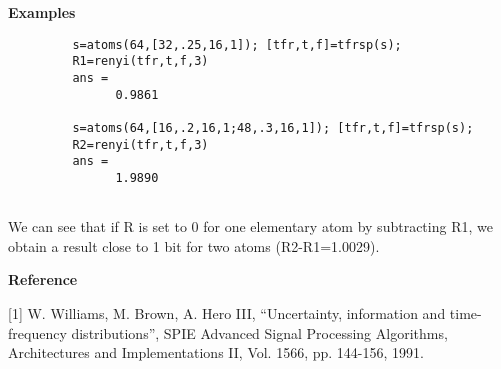 \newpage

{\bf \large \sf Examples}\\
\hspace*{1.5cm}
\begin{minipage}[t]{13.5cm}

\begin{verbatim}
         s=atoms(64,[32,.25,16,1]); [tfr,t,f]=tfrsp(s); 
         R1=renyi(tfr,t,f,3) 
         ans =
               0.9861

         s=atoms(64,[16,.2,16,1;48,.3,16,1]); [tfr,t,f]=tfrsp(s); 
         R2=renyi(tfr,t,f,3) 
         ans =
               1.9890
         
\end{verbatim}
We can see that if {\ttfamily R} is set to 0 for one elementary atom by
subtracting {\ttfamily R1}, we obtain a result close to 1 bit for two atoms
({\ttfamily R2-R1}=1.0029).
\end{minipage}
\vspace*{.5cm}


{\bf \large \sf Reference}\\
\hspace*{1.5cm}
\begin{minipage}[t]{13.5cm}
[1] W. Williams, M. Brown, A. Hero III, ``Uncertainty, information and
   time-frequency distributions'', SPIE Advanced Signal Processing
   Algorithms, Architectures and Implementations II, Vol. 1566,
   pp. 144-156, 1991.
\end{minipage}


